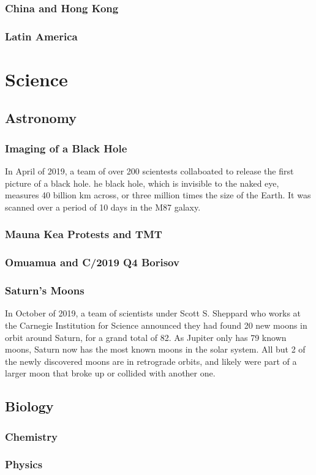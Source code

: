 			\subsubsection{China and Hong Kong}
			\subsubsection{Latin America}
	\section{Science}
		\subsection{Astronomy}
			\subsubsection{Imaging of a Black Hole}
			In April of 2019, a team of over 200 scientests collaboated to release the first picture of a black hole.  he black hole, which is invisible to the naked eye, measures 40 billion km across, or three million times the size of the Earth.  It was scanned over a period of 10 days in the M87 galaxy.  
			
			\subsubsection{Mauna Kea Protests and TMT}
			
			
			\subsubsection{Omuamua and C/2019 Q4 Borisov}
			
			
			\subsubsection{Saturn's Moons}
				In October of 2019, a team of scientists under Scott S. Sheppard who works at the Carnegie Institution for Science announced they had found 20 new moons in orbit around Saturn, for a grand total of 82. As Jupiter only has 79 known moons, Saturn now has the most known moons in the solar system.  All but 2 of the newly discovered moons are in retrograde orbits, and likely were part of a larger moon that broke up or collided with another one. 
		\subsection{Biology}
		\subsubsection{Chemistry}
		\subsubsection{Physics}
		